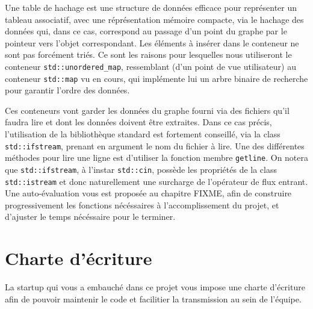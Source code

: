 \documentclass[9pts]{article}
\begin{document}
Une table de hachage est une structure de données efficace pour représenter un tableau associatif, avec une réprésentation mémoire compacte, via le hachage des données qui, dans ce cas, correspond au passage d'un point du graphe par le pointeur vers l'objet correspondant. Les éléments à insérer dans le conteneur ne sont pas forcément triés. Ce sont les raisons pour lesquelles nous utiliseront le conteneur \texttt{std::unordered\_map}, ressemblant (d'un point de vue utilisateur) au conteneur \texttt{std::map} vu en cours, qui implémente lui un arbre binaire de recherche pour garantir l'ordre des données.%

Ces conteneurs vont garder les données du graphe fourni via des fichiers qu'il faudra lire et dont les données doivent être extraites.
Dans ce cas précis, l'utilisation de la bibliothèque standard est fortement conseillé, via la class \texttt{std::ifstream}, prenant en argument le nom du fichier à lire. Une des différentes méthodes pour lire une ligne est d'utiliser la fonction membre \texttt{getline}. On notera que \texttt{std::ifstream}, à l'instar \texttt{std::cin}, possède les propriétés de la class \texttt{std::istream} et donc naturellement une surcharge de l'opérateur de flux entrant.\\

Une auto-évaluation vous est proposée au chapitre FIXME, afin de construire progressivement les fonctions nécéssaires à l'accomplissement du projet, et d'ajuster le temps nécéssaire pour le terminer.

\section{Charte d'écriture}
La startup qui vous a embauché dans ce projet vous impose une charte d'écriture afin de pouvoir maintenir le code et facilitier la transmission au sein de l'équipe.
\end{document}
